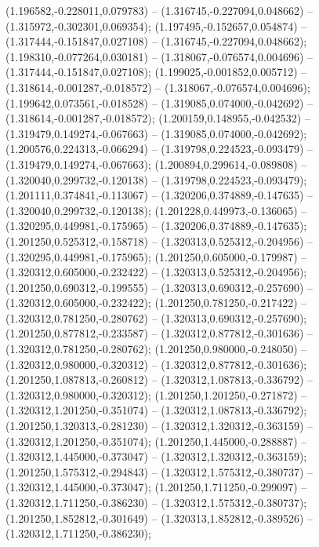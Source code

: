  (1.196582,-0.228011,0.079783) -- (1.316745,-0.227094,0.048662) -- (1.315972,-0.302301,0.069354);
 (1.197495,-0.152657,0.054874) -- (1.317444,-0.151847,0.027108) -- (1.316745,-0.227094,0.048662);
 (1.198310,-0.077264,0.030181) -- (1.318067,-0.076574,0.004696) -- (1.317444,-0.151847,0.027108);
 (1.199025,-0.001852,0.005712) -- (1.318614,-0.001287,-0.018572) -- (1.318067,-0.076574,0.004696);
 (1.199642,0.073561,-0.018528) -- (1.319085,0.074000,-0.042692) -- (1.318614,-0.001287,-0.018572);
 (1.200159,0.148955,-0.042532) -- (1.319479,0.149274,-0.067663) -- (1.319085,0.074000,-0.042692);
 (1.200576,0.224313,-0.066294) -- (1.319798,0.224523,-0.093479) -- (1.319479,0.149274,-0.067663);
 (1.200894,0.299614,-0.089808) -- (1.320040,0.299732,-0.120138) -- (1.319798,0.224523,-0.093479);
 (1.201111,0.374841,-0.113067) -- (1.320206,0.374889,-0.147635) -- (1.320040,0.299732,-0.120138);
 (1.201228,0.449973,-0.136065) -- (1.320295,0.449981,-0.175965) -- (1.320206,0.374889,-0.147635);
 (1.201250,0.525312,-0.158718) -- (1.320313,0.525312,-0.204956) -- (1.320295,0.449981,-0.175965);
 (1.201250,0.605000,-0.179987) -- (1.320312,0.605000,-0.232422) -- (1.320313,0.525312,-0.204956);
 (1.201250,0.690312,-0.199555) -- (1.320313,0.690312,-0.257690) -- (1.320312,0.605000,-0.232422);
 (1.201250,0.781250,-0.217422) -- (1.320312,0.781250,-0.280762) -- (1.320313,0.690312,-0.257690);
 (1.201250,0.877812,-0.233587) -- (1.320312,0.877812,-0.301636) -- (1.320312,0.781250,-0.280762);
 (1.201250,0.980000,-0.248050) -- (1.320312,0.980000,-0.320312) -- (1.320312,0.877812,-0.301636);
 (1.201250,1.087813,-0.260812) -- (1.320312,1.087813,-0.336792) -- (1.320312,0.980000,-0.320312);
 (1.201250,1.201250,-0.271872) -- (1.320312,1.201250,-0.351074) -- (1.320312,1.087813,-0.336792);
 (1.201250,1.320313,-0.281230) -- (1.320312,1.320312,-0.363159) -- (1.320312,1.201250,-0.351074);
 (1.201250,1.445000,-0.288887) -- (1.320312,1.445000,-0.373047) -- (1.320312,1.320312,-0.363159);
 (1.201250,1.575312,-0.294843) -- (1.320312,1.575312,-0.380737) -- (1.320312,1.445000,-0.373047);
 (1.201250,1.711250,-0.299097) -- (1.320312,1.711250,-0.386230) -- (1.320312,1.575312,-0.380737);
 (1.201250,1.852812,-0.301649) -- (1.320313,1.852812,-0.389526) -- (1.320312,1.711250,-0.386230);
